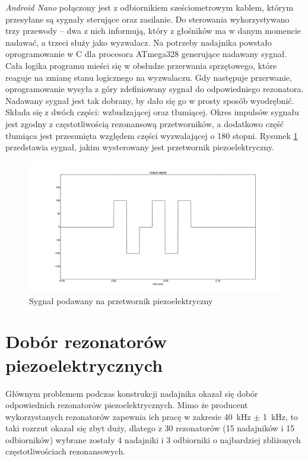 

\textit{Android Nano} połączony jest z odbiornikiem sześciometrowym kablem, którym przesyłane są sygnały sterujące oraz zasilanie.
Do sterowania wykorzystywano trzy przewody -- dwa z nich informują, który z głośników ma w danym momencie nadawać,
a trzeci służy jako wyzwalacz. 
Na potrzeby nadajnika powstało oprogramowanie w C dla procesora ATmega328 generujące nadawany sygnał.
Cała logika programu mieści się w obsłudze przerwania sprzętowego, które reaguje na zmianę stanu logicznego
na wyzwalaczu.
Gdy następuje przerwanie, oprogramowanie wysyła z góry zdefiniowany sygnał do odpowiedniego rezonatora. 
Nadawany sygnał jest tak dobrany, by dało się go w prosty sposób wyodrębnić. Składa się z dwóch
części: wzbudzającej oraz tłumiącej.
Okres impulsów sygnału jest zgodny z częstotliwością rezonansową przetworników, a dodatkowo część tłumiąca
jest przesunięta względem części wyzwalającej o 180 stopni.  
Rysunek \ref{fig:output_signal} przedstawia sygnał, jakim wysterowany jest przetwornik piezoelektryczny. 


\begin{figure}[h]
    \centering
    \includegraphics[width=1.15\textwidth, trim= 47mm 0mm 0mm 0mm,clip]{output_signal}
    \caption{Sygnał podawany na przetwornik piezoelektryczny}
    \label{fig:output_signal}
\end{figure}

\section{Dobór rezonatorów piezoelektrycznych}

Głównym problemem podczas konstrukcji nadajnika okazał się dobór odpowiednich rezonatorów piezoelektrycznych.
Mimo że producent wykorzystanych rezonatorów zapewnia ich pracę w zakresie \SI{40}{kHz} $\pm$ \SI{1}{kHz},
to taki rozrzut okazał się zbyt duży, 
dlatego z 30 rezonatorów (15 nadajników i 15 odbiorników) wybrane zostały 4 nadajniki i 3 odbiorniki o najbardziej 
zbliżonych częstotliwościach rezonansowych.

